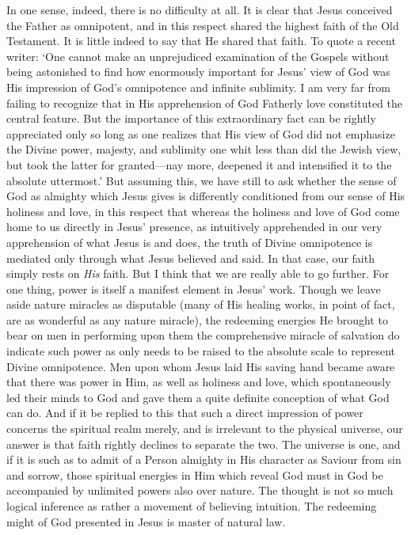 \documentclass[12pt,a5paper]{article}
\begin{document}
In one sense, indeed, there is no difficulty at all. It is clear that Jesus conceived the Father as omnipotent, and in this respect shared the highest faith of the Old Testament. It is little indeed to say that He shared that faith. To quote a recent writer: `One cannot make an unprejudiced examination of the Gospels without being astonished to find how enormously important for Jesus' view of God was His impression of God's omnipotence and infinite sublimity. I am very far from failing to recognize that in His apprehension of God Fatherly love constituted the central feature. But the importance of this extraordinary fact can be rightly appreciated only so long as one realizes that His view of God did not emphasize the Divine power, majesty, and sublimity one whit less than did the Jewish view, but took the latter for granted---nay more, deepened it and intensified it to the absolute uttermost.' But assuming this, we have still to ask whether the sense of God as almighty which Jesus gives is differently conditioned from our sense of His holiness and love, in this respect that whereas the holiness and love of God come home to us directly in Jesus' presence, as intuitively apprehended in our very apprehension of what Jesus is and does, the truth of Divine omnipotence is mediated only through what Jesus believed and said. In that case, our faith simply rests on \textit{His} faith. But I think that we are really able to go further. For one thing, power is itself a manifest element in Jesus' work. Though we leave aside nature miracles as disputable (many of His healing works, in point of fact, are as wonderful as any nature miracle), the redeeming energies He brought to bear on men in performing upon them the comprehensive miracle of salvation do indicate such power as only needs to be raised to the absolute
scale to represent Divine omnipotence. Men upon whom Jesus laid His saving hand became aware that there was power in Him, as well as holiness and love, which spontaneously led their minds to God and gave them a quite definite conception of what God can do. And if it be replied to this that such a direct impression of power concerns the spiritual realm merely, and is irrelevant to the physical universe, our answer is that faith rightly declines to separate the two. The universe is one, and if it is such as to admit of a Person almighty in His character as Saviour from sin and sorrow, those spiritual energies in Him which reveal God must in God be accompanied by unlimited powers also over nature. The thought is not so much logical inference as rather a movement of believing intuition. The redeeming might of God presented in Jesus is master of natural law.
\end{document}
